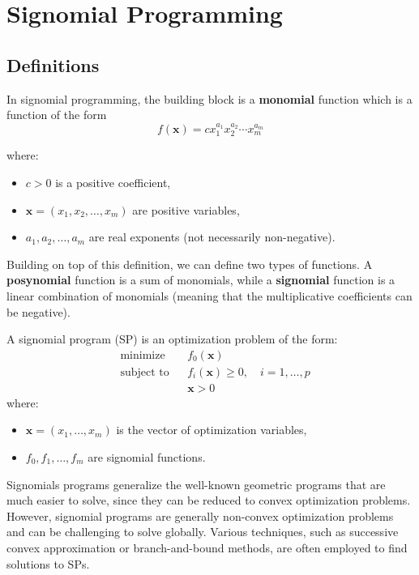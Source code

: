\section{Signomial Programming}\label{sec:signomial-programming}

\subsection{Definitions}\label{subsec:definitions}
In signomial programming, the building block is a \textbf{monomial} function which is a function of the form
\[f(\mathbf{x}) = c x_1^{a_1} x_2^{a_2} \cdots x_m^{a_m}\]

where:
\begin{itemize}
    \item $c > 0$ is a positive coefficient,
    \item $\mathbf{x} = (x_1, x_2, \ldots, x_m)$ are positive variables,
    \item $a_1, a_2, \ldots, a_m$ are real exponents (not necessarily non-negative).
\end{itemize}
Building on top of this definition, we can define two types of functions.
A \textbf{posynomial} function is a sum of monomials, while a \textbf{signomial} function is a linear combination of monomials (meaning that the multiplicative coefficients can be negative).

A signomial program (SP) is an optimization problem of the form:
\[
    \begin{aligned}
        & \text{minimize}   & & f_0(\mathbf{x}) \\
        & \text{subject to} & & f_i(\mathbf{x}) \geq 0, \quad i = 1, \ldots, p \\
        &                   & & \mathbf{x} > 0
    \end{aligned}
\]
where:

\begin{itemize}
    \item $\mathbf{x} = (x_1, \ldots, x_m)$ is the vector of optimization variables,
    \item $f_0, f_1, \ldots, f_m$ are signomial functions.
\end{itemize}

Signomials programs generalize the well-known geometric programs that are much easier to solve, since they can be reduced to convex optimization problems.
However, signomial programs are generally non-convex optimization problems and can be challenging to solve globally.
Various techniques, such as successive convex approximation or branch-and-bound methods, are often employed to find solutions to SPs.

